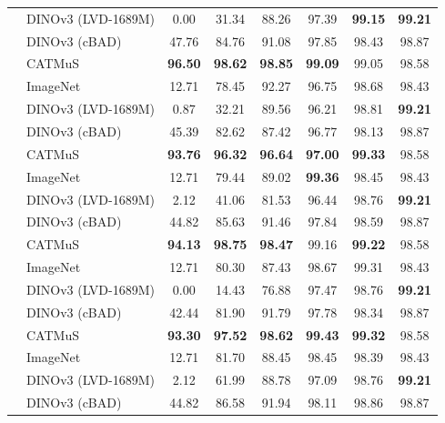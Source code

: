 \begin{table}[htbp]
\begin{tabular}{@{}llcccccc@{}}
         & DINOv3 (LVD-1689M) & 0.00 & 31.34 & 88.26 & 97.39 & \textbf{99.15} & \textbf{99.21} \\
         & DINOv3 (cBAD)      & 47.76 & 84.76 & 91.08 & 97.85 & 98.43 & 98.87 \\
         & CATMuS             & \textbf{96.50} & \textbf{98.62} & \textbf{98.85} & \textbf{99.09} & 99.05 & 98.58 \\
        \addlinespace[2pt]
        \multirow{4}{*}{Grayscale variance} & ImageNet           & 12.71 & 78.45 & 92.27 & 96.75 & 98.68 & 98.43 \\
         & DINOv3 (LVD-1689M) & 0.87 & 32.21 & 89.56 & 96.21 & 98.81 & \textbf{99.21} \\
         & DINOv3 (cBAD)      & 45.39 & 82.62 & 87.42 & 96.77 & 98.13 & 98.87 \\
         & CATMuS             & \textbf{93.76} & \textbf{96.32} & \textbf{96.64} & \textbf{97.00} & \textbf{99.33} & 98.58 \\
        \addlinespace[2pt]
        \multirow{4}{*}{PCA max--min} & ImageNet           & 12.71 & 79.44 & 89.02 & \textbf{99.36} & 98.45 & 98.43 \\
         & DINOv3 (LVD-1689M) & 2.12 & 41.06 & 81.53 & 96.44 & 98.76 & \textbf{99.21} \\
         & DINOv3 (cBAD)      & 44.82 & 85.63 & 91.46 & 97.84 & 98.59 & 98.87 \\
         & CATMuS             & \textbf{94.13} & \textbf{98.75} & \textbf{98.47} & 99.16 & \textbf{99.22} & 98.58 \\
        \addlinespace[2pt]
        \multirow{4}{*}{PCA centroid} & ImageNet           & 12.71 & 80.30 & 87.43 & 98.67 & 99.31 & 98.43 \\
         & DINOv3 (LVD-1689M) & 0.00 & 14.43 & 76.88 & 97.47 & 98.76 & \textbf{99.21} \\
         & DINOv3 (cBAD)      & 42.44 & 81.90 & 91.79 & 97.78 & 98.34 & 98.87 \\
         & CATMuS             & \textbf{93.30} & \textbf{97.52} & \textbf{98.62} & \textbf{99.43} & \textbf{99.32} & 98.58 \\
        \addlinespace[2pt]
        \multirow{4}{*}{ICA max--min} & ImageNet           & 12.71 & 81.70 & 88.45 & 98.45 & 98.39 & 98.43 \\
         & DINOv3 (LVD-1689M) & 2.12 & 61.99 & 88.78 & 97.09 & 98.76 & \textbf{99.21} \\
         & DINOv3 (cBAD)      & 44.82 & 86.58 & 91.94 & 98.11 & 98.86 & 98.87 \\

\end{tabular}
\end{table}
